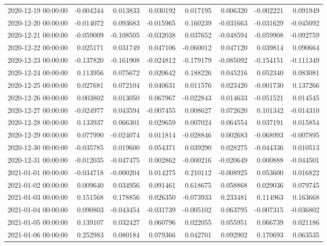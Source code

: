 \begin{tabular}{lrrrrrrr}
2020-12-19 00:00:00 & -0.004244 & 0.013833 & 0.030192 & 0.017195 & 0.006320 & -0.002221 & 0.091949 \\
2020-12-20 00:00:00 & -0.014072 & 0.093683 & -0.015965 & 0.160239 & -0.031663 & -0.031629 & -0.045092 \\
2020-12-21 00:00:00 & -0.059009 & -0.108505 & -0.032038 & 0.037652 & -0.048594 & -0.059908 & -0.092759 \\
2020-12-22 00:00:00 & 0.025171 & 0.031749 & 0.047106 & -0.060012 & 0.047120 & 0.039814 & 0.090664 \\
2020-12-23 00:00:00 & -0.137820 & -0.161908 & -0.024812 & -0.179179 & -0.085092 & -0.154151 & -0.111349 \\
2020-12-24 00:00:00 & 0.113956 & 0.075672 & 0.020642 & 0.188226 & 0.045216 & 0.052340 & 0.083081 \\
2020-12-25 00:00:00 & 0.027681 & 0.072104 & 0.040631 & 0.011576 & 0.023420 & -0.001730 & 0.137266 \\
2020-12-26 00:00:00 & 0.003802 & 0.013050 & 0.067967 & -0.022843 & 0.014633 & -0.051521 & 0.014545 \\
2020-12-27 00:00:00 & -0.024977 & 0.043594 & -0.007455 & 0.008627 & 0.072620 & 0.101342 & -0.014310 \\
2020-12-28 00:00:00 & 0.133937 & 0.066301 & 0.029659 & 0.007024 & 0.064554 & 0.037191 & 0.015854 \\
2020-12-29 00:00:00 & 0.077990 & -0.024074 & 0.011814 & -0.028846 & 0.002683 & -0.068993 & -0.007895 \\
2020-12-30 00:00:00 & -0.035785 & 0.019600 & 0.054371 & 0.039290 & 0.028275 & -0.044336 & 0.010513 \\
2020-12-31 00:00:00 & -0.012035 & -0.047475 & 0.002862 & -0.000216 & -0.020649 & 0.000888 & -0.044501 \\
2021-01-01 00:00:00 & -0.034718 & -0.000204 & 0.014275 & 0.210112 & -0.008925 & 0.053600 & 0.016822 \\
2021-01-02 00:00:00 & 0.009640 & 0.034956 & 0.091461 & 0.618675 & 0.058868 & 0.029036 & 0.079745 \\
2021-01-03 00:00:00 & 0.151568 & 0.178856 & 0.026350 & -0.073933 & 0.233481 & 0.114963 & 0.163668 \\
2021-01-04 00:00:00 & 0.090803 & -0.043454 & -0.031739 & -0.005102 & 0.063795 & -0.007315 & -0.036802 \\
2021-01-05 00:00:00 & 0.139107 & 0.032427 & 0.060796 & 0.022055 & 0.055951 & 0.066739 & 0.021186 \\
2021-01-06 00:00:00 & 0.252983 & 0.080184 & 0.079366 & 0.042701 & 0.092902 & 0.170693 & 0.063535 \\

\end{tabular}
